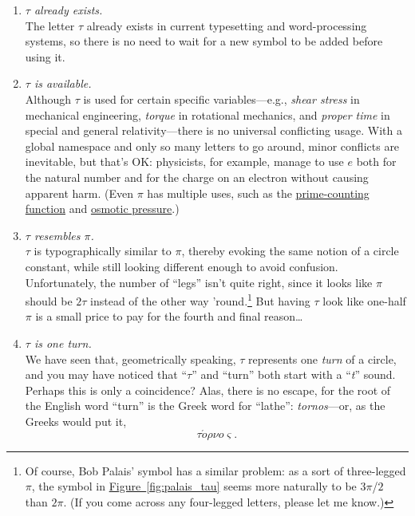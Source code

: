 \documentclass{article}
\begin{document}
\begin{enumerate}
  
  \item \emph{$\tau$ already exists.} \\ The letter $\tau$ already exists in current typesetting and word-processing systems, so there is no need to wait for a new symbol to be added before using it.
  
  \item \emph{$\tau$ is available.} \\ Although $\tau$ is used for certain specific variables---e.g., \emph{shear stress} in mechanical engineering, \emph{torque} in rotational mechanics, and \emph{proper time} in special and general relativity---there is no universal conflicting usage. With a global namespace and only so many letters to go around, minor conflicts are inevitable, but that's OK: physicists, for example, manage to use $e$ both for the natural number and for the charge on an electron without causing apparent harm. (Even $\pi$ has multiple uses, such as the \href{http://mathworld.wolfram.com/PrimeCountingFunction.html}{prime-counting function} and \href{http://www.chem.purdue.edu/gchelp/howtosolveit/Solutions/osmoticpressure.html}{osmotic pressure}.)
  
  \item \emph{$\tau$ resembles $\pi$.} \\ $\tau$ is typographically similar to $\pi$, thereby evoking the same notion of a circle constant, while still looking different enough to avoid confusion. Unfortunately, the number of ``legs'' isn't quite right, since it looks like $\pi$ should be $2\tau$ instead of the other way 'round.\footnote{Of course, Bob Palais' symbol has a similar problem: as a sort of three-legged $\pi$, the symbol in \hyperref[fig:palais_tau]{Figure~}\ref{fig:palais_tau} seems more naturally to be $3\pi$/$2$ than $2\pi$. (If you come across any four-legged letters, please let me know.)} But having $\tau$ look like one-half $\pi$ is a small price to pay for the fourth and final reason\ldots
%
  
  \item \emph{$\tau$ is one turn.} \\ We have seen that, geometrically speaking, $\tau$ represents one \emph{turn} of a circle, and you may have noticed that ``$\tau$'' and ``turn'' both start with a ``\emph{t}'' sound. Perhaps this is only a coincidence? Alas, there is no escape, for the root of the English word ``turn'' is the Greek word for ``lathe'': \emph{tornos}---or, as the Greeks would put it, \[ \tau \acute{o}\rho\nu o\varsigma. \]
  
\end{enumerate}
\end{document}
